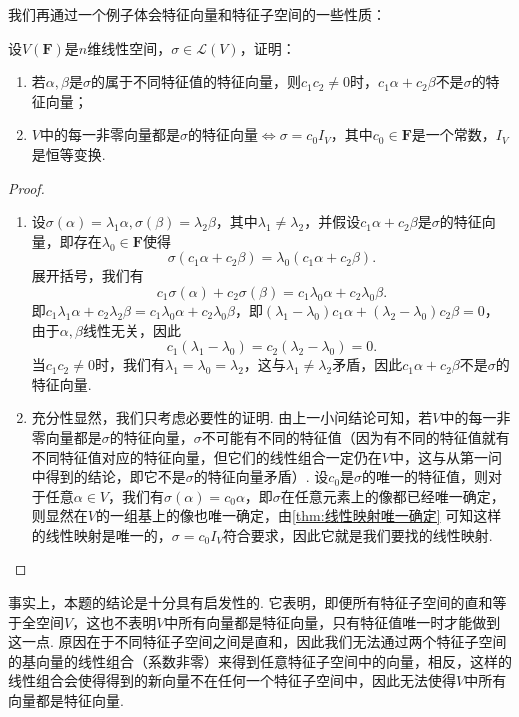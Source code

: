 我们再通过一个例子体会特征向量和特征子空间的一些性质：
\begin{example}{}{}
    设$V(\mathbf{F})$是$n$维线性空间，$\sigma\in \mathcal{L}(V)$，证明：
    \begin{enumerate}
        \item 若$\alpha,\beta$是$\sigma$的属于不同特征值的特征向量，则$c_1c_2\neq 0$时，$c_1\alpha+c_2\beta$不是$\sigma$的特征向量；

        \item $V$中的每一非零向量都是$\sigma$的特征向量$\iff\sigma=c_0I_V$，其中$c_0\in\mathbf{F}$是一个常数，$I_V$是恒等变换.
    \end{enumerate}
\end{example}

\begin{proof}
    \begin{enumerate}
        \item 设$\sigma(\alpha)=\lambda_1\alpha,\sigma(\beta)=\lambda_2\beta$，其中$\lambda_1\neq\lambda_2$，并假设$c_1\alpha+c_2\beta$是$\sigma$的特征向量，即存在$\lambda_0\in\mathbf{F}$使得
              \[\sigma(c_1\alpha+c_2\beta)=\lambda_0(c_1\alpha+c_2\beta).\]
              展开括号，我们有
              \[c_1\sigma(\alpha)+c_2\sigma(\beta)=c_1\lambda_0\alpha+c_2\lambda_0\beta.\]
              即$c_1\lambda_1\alpha+c_2\lambda_2\beta=c_1\lambda_0\alpha+c_2\lambda_0\beta$，即$(\lambda_1-\lambda_0)c_1\alpha+(\lambda_2-\lambda_0)c_2\beta=0$，由于$\alpha,\beta$线性无关，因此
              \[c_1(\lambda_1-\lambda_0)=c_2(\lambda_2-\lambda_0)=0.\]
              当$c_1c_2\neq 0$时，我们有$\lambda_1=\lambda_0=\lambda_2$，这与$\lambda_1\neq\lambda_2$矛盾，因此$c_1\alpha+c_2\beta$不是$\sigma$的特征向量.

        \item 充分性显然，我们只考虑必要性的证明. 由上一小问结论可知，若$V$中的每一非零向量都是$\sigma$的特征向量，$\sigma$不可能有不同的特征值（因为有不同的特征值就有不同特征值对应的特征向量，但它们的线性组合一定仍在$V$中，这与从第一问中得到的结论，即它不是$\sigma$的特征向量矛盾）. 设$c_0$是$\sigma$的唯一的特征值，则对于任意$\alpha\in V$，我们有$\sigma(\alpha)=c_0\alpha$，即$\sigma$在任意元素上的像都已经唯一确定，则显然在$V$的一组基上的像也唯一确定，由\autoref{thm:线性映射唯一确定} 可知这样的线性映射是唯一的，$\sigma=c_0I_V$符合要求，因此它就是我们要找的线性映射.
    \end{enumerate}
\end{proof}

事实上，本题的结论是十分具有启发性的. 它表明，即便所有特征子空间的直和等于全空间$V$，这也不表明$V$中所有向量都是特征向量，只有特征值唯一时才能做到这一点. 原因在于不同特征子空间之间是直和，因此我们无法通过两个特征子空间的基向量的线性组合（系数非零）来得到任意特征子空间中的向量，相反，这样的线性组合会使得得到的新向量不在任何一个特征子空间中，因此无法使得$V$中所有向量都是特征向量.

